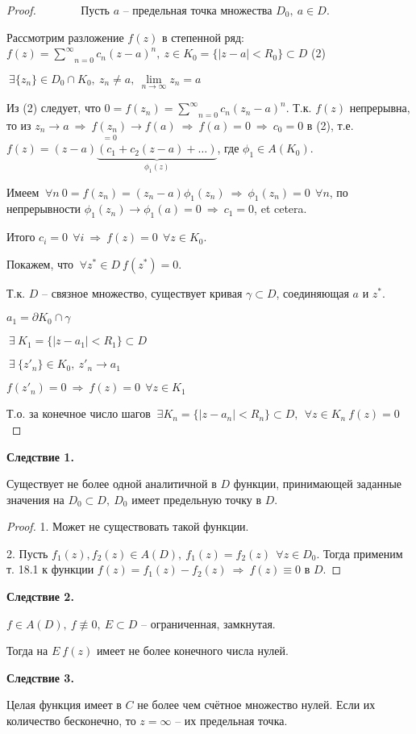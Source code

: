 \documentclass[draft]{article}
\newcommand{\forcenewline}{$\phantom{\mbox{newline}}$\newline}
\newcommand{\dd}{\partial}
\newcommand{\then}{\ \Rightarrow\ }
\newcommand{\msum}[2]{\underset{#1}{\overset{#2}{\sum}}}
\newcommand{\ssum}{\msum{n=0}{\infty}}
\newcommand{\mlim}[1]{\underset{#1}{\lim}}
\newcommand{\g}{\gamma}
\renewcommand{\f}{\phi}
\newcommand{\E}{\ \exists}
\newcommand{\F}{\ \forall}
\theoremstyle{remark}
\begin{document}
\begin{proof}
\forcenewline
Пусть $a$ -- предельная точка множества $D_0,\ a\in D$. 

Рассмотрим разложение $f(z)$ в степенной ряд: $f(z)=\ssum c_n(z-a)^n,\ z\in K_0=\{|z-a|<R_0\}\subset D$ (2)

$\E \{z_n\}\in D_0\cap K_0,\ z_n\neq a,\ \mlim{n\to\infty}z_n=a$

Из (2) следует, что $0=f(z_n)=\ssum c_n(z_n-a)^n$. Т.к. $f(z)$ непрерывна, то из $z_n\to a\then \underset{=0}{f(z_n)}\to f(a)\then f(a)=0\then c_0=0$ в (2), т.е. $f(z)=(z-a)\underset{\f_1(z)}{\underbrace{(c_1+c_2(z-a)+\ldots)}}$, где $\f_1\in A(K_0)$.

Имеем $\F n\ 0=f(z_n)=(z_n-a)\f_1(z_n) \then \f_1(z_n)=0\ \F n$, по непрерывности $\f_1(z_n)\to\f_1(a)=0\then c_1=0$, et cetera.

Итого $c_i=0\ \F i\then f(z)=0\ \F z\in K_0$.

Покажем, что $\F z^*\in D\ f(z^*)=0$.

Т.к. $D$ -- связное множество, существует кривая $\g\subset D$, соединяющая $a$ и $z^*$.

$a_1=\dd K_0\cap\g$

$\E\ K_1=\{|z-a_1|<R_1\}\subset D$

$\E\ \{z'_n\}\in K_0,\ z'_n\to a_1$

$f(z'_n)=0\then f(z)=0\ \F z\in K_1$

Т.о. за конечное число шагов $\E K_n=\{|z-a_n|<R_n\}\subset D,\ \F z\in K_n\ f(z)=0$
\end{proof}

{\bfseries Следствие 1.}

Существует не более одной аналитичной в $D$ функции, принимающей заданные значения на $D_0\subset D,\ D_0$ имеет предельную точку в $D$.
\begin{proof}
1. Может не существовать такой функции.

2. Пусть $f_1(z),f_2(z)\in A(D),\ f_1(z)=f_2(z)\ \F z\in D_0$. Тогда применим т. 18.1 к функции $f(z)=f_1(z)-f_2(z)\then f(z)\equiv 0$ в $D$.
\end{proof}

{\bfseries Следствие 2.}

$f\in A(D),\ f\not\equiv0,\ E\subset D$ -- ограниченная, замкнутая.

Тогда на $E\ f(z)$ имеет не более конечного числа нулей.

{\bfseries Следствие 3.}

Целая функция имеет в $C$ не более чем счётное множество нулей. Если их количество бесконечно, то $z=\infty$ -- их предельная точка.
\end{document}
